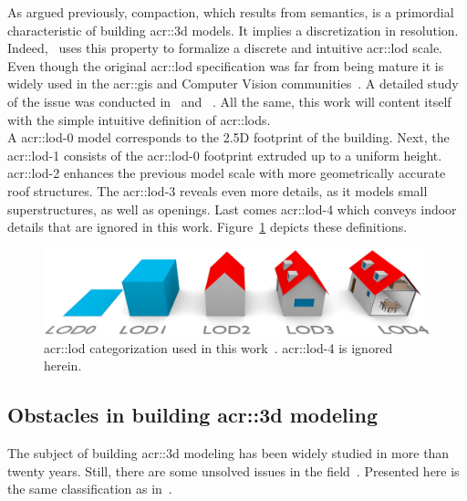             As argued previously, compaction, which results from semantics, is a primordial characteristic of building \gls{acr::3d} models.
            It implies a discretization in resolution.
            Indeed,~\textcite{groger2012citygml} uses this property to formalize a discrete and intuitive \gls{acr::lod} scale.
            Even though the original \gls{acr::lod} specification was far from being mature it is widely used in the \gls{acr::gis} and Computer Vision communities~\parencite{biljecki2014formalisation, rau2006lod}.
            A detailed study of the issue was conducted in~\textcite{biljecki2014formalisation} and ~\textcite{biljecki2016improved}.
            All the same, this work will content itself with the simple intuitive definition of \glspl{acr::lod}.\\
            A \gls*{acr::lod}-0 model corresponds to the 2.5D footprint of the building.
            Next, the \gls*{acr::lod}-1 consists of the \gls*{acr::lod}-0 footprint extruded up to a uniform height.
            \gls*{acr::lod}-2 enhances the previous model scale with more geometrically accurate roof structures.
            The \gls*{acr::lod}-3 reveals even more details, as it models small superstructures, as well as openings.
            Last comes \gls*{acr::lod}-4 which conveys indoor details that are ignored in this work.
            Figure~\ref{fig::lods} depicts these definitions.\\

            \begin{figure}[htpb]
                \centering
                \includegraphics[width=.7\textwidth]{images/introduction/lods}            
                \caption{
                    \label{fig::lods} \gls{acr::lod} categorization used in this work~\parencite{biljecki2016improved}.
                    \gls{acr::lod}-4 is ignored herein.
                }
            \end{figure}
    \subsection{Obstacles in building \gls*{acr::3d} modeling}
        \label{subsec::introduction::urban_3d_reconstruction::challenges}
        The subject of building \gls{acr::3d} modeling has been widely studied in more than twenty years.
        Still, there are some unsolved issues in the field~\parencite{musialski2013survey, lafarge2015some}.
        Presented here is the same classification as in~\textcite{lafarge2015some}.

